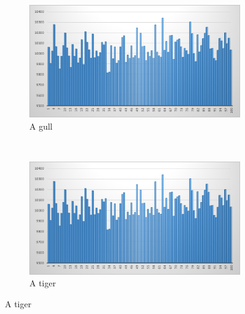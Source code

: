 \documentclass[12pt,a4paper,article]{memoir} %
\begin{document}
\begin{figure}[h!]
    \begin{subfigure}[b]{0.45\textwidth}
        \includegraphics[width=\textwidth]{img/uni-m-1.png}
        \caption{A gull}
        \label{fig:gull}
    \end{subfigure}
    ~ %
    \begin{subfigure}[b]{0.45\textwidth}
        \includegraphics[width=\textwidth]{img/uni-m-1.png}
        \caption{A tiger}
        \label{fig:tiger}
    \end{subfigure}


\end{figure}
\end{document}
